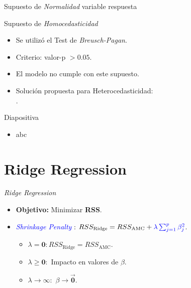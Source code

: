 \documentclass[11pt]{beamer}
\newcommand{\B}{\beta}
\begin{document}
\begin{frame}{Supuesto de \textit{Normalidad}}
variable respuesta
\end{frame}

\begin{frame}{Supuesto de \textit{Homocedasticidad}}
	\begin{itemize}
		\item Se utilizó el Test de \textit{Breusch-Pagan}.
		\pause
		\item Criterio: valor-p $>\mathbf{0.05}$.
		\pause
		\item El modelo no cumple con este supuesto.
		\pause
		\item Solución propuesta para Heterocedasticidad: \\ .
	\end{itemize}
\end{frame}

\begin{frame}{Diapositiva}
	\begin{itemize}
		\item abc
	\end{itemize}
\end{frame}



\section{Ridge Regression}

\begin{frame}{\textit{Ridge Regression}}
	\begin{itemize}
		\item \textbf{Objetivo:} Minimizar \textbf{RSS}.
		\pause
		\item \textcolor{blue}{\textit{Shrinkage Penalty}} : $RSS_{\text{Ridge}} = RSS_{\text{AMC}} + \textcolor{blue}{\lambda \sum^p_{j=1} \beta_j^2}$.
		\begin{itemize}
			\item $\lambda = \mathbf{0}: RSS_{\text{Ridge}} = RSS_{\text{AMC}}$.
			\item $\lambda \geq \mathbf{0}:$ Impacto en valores de $\B$.
			\item $\lambda \to \mathbf{\infty}:$ $\B \to \vec{\mathbf{0}}$.
		\end{itemize}
	\end{itemize}
\end{frame}
\end{document}
